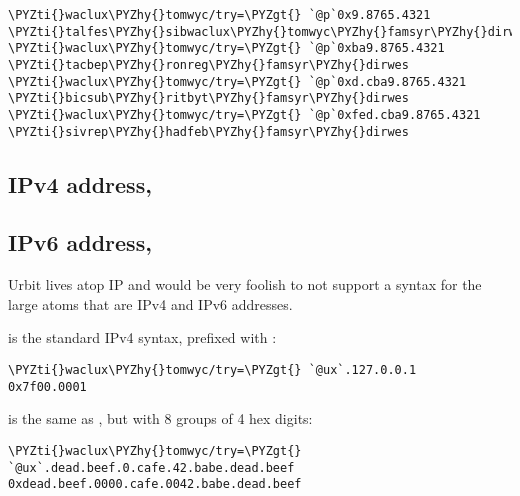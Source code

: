 \begin{framed_shaded}
\begin{Verbatim}[fontsize=\relsize{-2.5},fontseries=b,commandchars=\\\{\}]
\PYZti{}waclux\PYZhy{}tomwyc/try=\PYZgt{} `@p`0x9.8765.4321
\PYZti{}talfes\PYZhy{}sibwaclux\PYZhy{}tomwyc\PYZhy{}famsyr\PYZhy{}dirwes
\PYZti{}waclux\PYZhy{}tomwyc/try=\PYZgt{} `@p`0xba9.8765.4321
\PYZti{}tacbep\PYZhy{}ronreg\PYZhy{}famsyr\PYZhy{}dirwes
\PYZti{}waclux\PYZhy{}tomwyc/try=\PYZgt{} `@p`0xd.cba9.8765.4321
\PYZti{}bicsub\PYZhy{}ritbyt\PYZhy{}famsyr\PYZhy{}dirwes
\PYZti{}waclux\PYZhy{}tomwyc/try=\PYZgt{} `@p`0xfed.cba9.8765.4321
\PYZti{}sivrep\PYZhy{}hadfeb\PYZhy{}famsyr\PYZhy{}dirwes
\end{Verbatim}
\end{framed_shaded}

\subsection{IPv4 address, }

\subsection{IPv6 address, }

Urbit lives atop IP and would be very foolish to not support
a syntax for the large atoms that are IPv4 and IPv6 addresses.

 is the standard IPv4 syntax, prefixed with :

\begin{framed_shaded}
\begin{Verbatim}[fontsize=\relsize{-2.5},fontseries=b,commandchars=\\\{\}]
\PYZti{}waclux\PYZhy{}tomwyc/try=\PYZgt{} `@ux`.127.0.0.1
0x7f00.0001
\end{Verbatim}
\end{framed_shaded}

 is the same as , but with 8 groups of 4 hex digits:

\begin{framed_shaded}
\begin{Verbatim}[fontsize=\relsize{-2.5},fontseries=b,commandchars=\\\{\}]
\PYZti{}waclux\PYZhy{}tomwyc/try=\PYZgt{} `@ux`.dead.beef.0.cafe.42.babe.dead.beef
0xdead.beef.0000.cafe.0042.babe.dead.beef
\end{Verbatim}
\end{framed_shaded}

